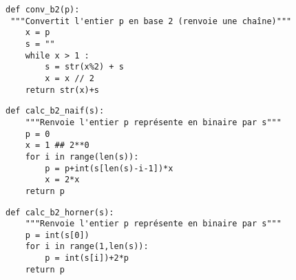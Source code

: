 
\begin{lstlisting}
def conv_b2(p):
 """Convertit l'entier p en base 2 (renvoie une chaîne)"""
    x = p
    s = ""
    while x > 1 :
        s = str(x%2) + s
        x = x // 2
    return str(x)+s
\end{lstlisting}    


\begin{lstlisting}
def calc_b2_naif(s):
    """Renvoie l'entier p représente en binaire par s"""
    p = 0
    x = 1 ## 2**0
    for i in range(len(s)):
        p = p+int(s[len(s)-i-1])*x
        x = 2*x
    return p
\end{lstlisting}


\begin{lstlisting}
def calc_b2_horner(s):
    """Renvoie l'entier p représente en binaire par s"""
    p = int(s[0])
    for i in range(1,len(s)):
        p = int(s[i])+2*p
    return p
\end{lstlisting}